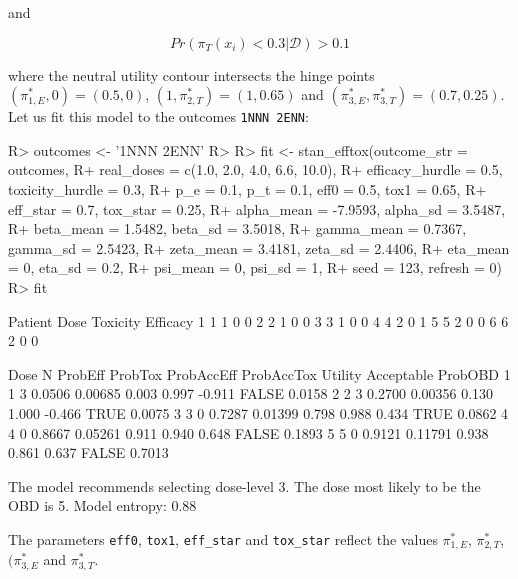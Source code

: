 \documentclass[article]{jss}
\begin{document}
and

\begin{equation}
Pr(\pi_T(x_i) < 0.3 | \mathcal{D}) > 0.1
\end{equation}

where the neutral utility contour intersects the hinge points
\((\pi_{1,E}^*, 0) = (0.5, 0)\), \((1, \pi_{2,T}^*) = (1, 0.65)\) and
\((\pi_{3,E}^*, \pi_{3,T}^*) = (0.7, 0.25)\). Let us fit this model to
the outcomes \texttt{1NNN\ 2ENN}:

\begin{CodeChunk}

\begin{CodeInput}
R> outcomes <- '1NNN 2ENN'
R> 
R> fit <- stan_efftox(outcome_str = outcomes,
R+                    real_doses = c(1.0, 2.0, 4.0, 6.6, 10.0),
R+                    efficacy_hurdle = 0.5, toxicity_hurdle = 0.3,
R+                    p_e = 0.1, p_t = 0.1, eff0 = 0.5, tox1 = 0.65,
R+                    eff_star = 0.7, tox_star = 0.25,
R+                    alpha_mean = -7.9593, alpha_sd = 3.5487,
R+                    beta_mean = 1.5482, beta_sd = 3.5018,
R+                    gamma_mean = 0.7367, gamma_sd = 2.5423,
R+                    zeta_mean = 3.4181, zeta_sd = 2.4406,
R+                    eta_mean = 0, eta_sd = 0.2,
R+                    psi_mean = 0, psi_sd = 1, 
R+                    seed = 123, refresh = 0)
R> fit
\end{CodeInput}

\begin{CodeOutput}
  Patient Dose Toxicity Efficacy
1       1    1        0        0
2       2    1        0        0
3       3    1        0        0
4       4    2        0        1
5       5    2        0        0
6       6    2        0        0

  Dose N ProbEff ProbTox ProbAccEff ProbAccTox Utility Acceptable ProbOBD
1    1 3  0.0506 0.00685      0.003      0.997  -0.911      FALSE  0.0158
2    2 3  0.2700 0.00356      0.130      1.000  -0.466       TRUE  0.0075
3    3 0  0.7287 0.01399      0.798      0.988   0.434       TRUE  0.0862
4    4 0  0.8667 0.05261      0.911      0.940   0.648      FALSE  0.1893
5    5 0  0.9121 0.11791      0.938      0.861   0.637      FALSE  0.7013

The model recommends selecting dose-level 3.
The dose most likely to be the OBD is 5.
Model entropy: 0.88
\end{CodeOutput}
\end{CodeChunk}

The parameters \texttt{eff0}, \texttt{tox1}, \texttt{eff\_star} and
\texttt{tox\_star} reflect the values \(\pi_{1,E}^*\), \(\pi_{2,T}^*\),
\((\pi_{3,E}^*\) and \(\pi_{3,T}^*\).
\end{document}
